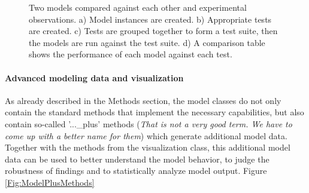 \documentclass[a4paper,10pt]{article}
\begin{document}
\begin{figure}
\caption{Two models compared against each other and experimental observations. a) Model instances are created. b) Appropriate tests are created. c) Tests are grouped together to form a test suite, then the models
are run against the test suite. d) A comparison table shows the performance of each model against each test.}
\label{Fig:ModelComparisons}
\end{figure}

\paragraph{Advanced modeling data and visualization}
As already described in the Methods section, the model classes do not only contain the standard methods that implement the necessary capabilities, but also contain so-called '...\_plus' methods (\textit{That is not a very good term. 
We have to come up with a better name for them}) which generate additional model data. Together with the methods from the visualization class, this additional model data can be used to better understand the model behavior, 
to judge the robustness of findings and to statistically analyze model output. Figure \ref{Fig:ModelPlusMethods}
\end{document}
